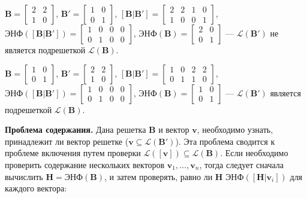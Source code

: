 $ \mathbf{B} = \left[\begin{array}{cccc}
2 & 2 \\
1 & 0
\end{array}\right] $, 
$ \mathbf{B}' = \left[\begin{array}{cccc}
1 & 0 \\
0 & 1
\end{array}\right] $, 
$ \left[\mathbf{B} | \mathbf{B}'\right] = \left[\begin{array}{cccc}
2 & 2 & 1 & 0 \\
1 & 0 & 0 & 1
\end{array}\right] $, 
$ \text{ЭНФ}(\left[\mathbf{B} | \mathbf{B}' \right]) = \left[\begin{array}{cccc}
1 & 0 & 0 & 0 \\
0 & 1 & 0 & 0
\end{array}\right] $,
$ \text{ЭНФ}(\mathbf{B}) = \left[\begin{array}{cccc}
2 & 0 \\
0 & 1
\end{array}\right] $ --- $ \mathcal{L}(\mathbf{B}') $ не является подрешеткой $ \mathcal{L}(\mathbf{B}) $.

$ \mathbf{B} = \left[\begin{array}{cccc}
1 & 0 \\
0 & 1
\end{array}\right] $, 
$ \mathbf{B}' = \left[\begin{array}{cccc}
2 & 2 \\
1 & 0
\end{array}\right] $, 
$ \left[\mathbf{B} | \mathbf{B}'\right] = \left[\begin{array}{cccc}
1 & 0 & 2 & 2 \\
0 & 1 & 1 & 0
\end{array}\right] $, 
$ \text{ЭНФ}(\left[\mathbf{B} | \mathbf{B}' \right]) = \left[\begin{array}{cccc}
1 & 0 & 0 & 0 \\
0 & 1 & 0 & 0
\end{array}\right] $,
$ \text{ЭНФ}(\mathbf{B}) = \left[\begin{array}{cccc}
1 & 0 \\
0 & 1
\end{array}\right] $ --- $ \mathcal{L}(\mathbf{B}') $ является подрешеткой $ \mathcal{L}(\mathbf{B}) $.

\textbf{Проблема содержания.} Дана решетка $ \mathbf{B} $ и вектор $ \mathbf{v} $, необходимо узнать, принадлежит ли вектор решетке ($ \mathbf{v} \subseteq \mathcal{L}(\mathbf{B}') $). Эта проблема сводится к проблеме включения путем проверки $ \mathcal{L}(\left[\mathbf{v}\right]) \subseteq \mathcal{L}(\mathbf{B}) $. Если необходимо проверить содержание нескольких векторов $ \mathbf{v}_1, \ldots, \mathbf{v}_n $, тогда следует сначала вычислить $ \mathbf{H} = \text{ЭНФ}(\mathbf{B}) $, и затем проверять, равно ли $ \mathbf{H} $ $ \text{ЭНФ}(\left[\mathbf{H} | \mathbf{v}_i \right]) $ для каждого вектора:

